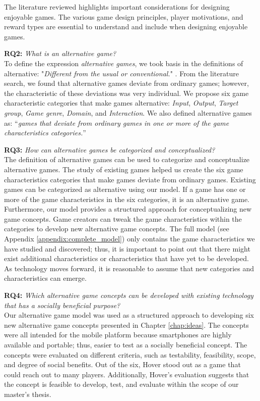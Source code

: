 \documentclass[../Main.tex]{subfiles}
\begin{document}
The literature reviewed highlights important considerations for designing enjoyable games. The various game design principles, player motivations, and reward types are essential to understand and include when designing enjoyable games. 

\textbf{RQ2:} \textit{What is an alternative game?}\\
To define the expression \textit{alternative games}, we took basis in the definitions of alternative: "\textit{Different from the usual or conventional.}" \citep{merriam-webster_alternative_2020}. From the literature search, we found that alternative games deviate from ordinary games; however, the characteristic of these deviations was very individual. We propose six game characteristic categories that make games alternative: \textit{Input}, \textit{Output}, \textit{Target group}, \textit{Game genre}, \textit{Domain}, and \textit{Interaction}. We also defined alternative games as: 
 “\textit{games that deviate from ordinary games in one or more of the game characteristics categories.}”

\textbf{RQ3:} \textit{How can alternative games be categorized and conceptualized?}\\
The definition of alternative games can be used to categorize and conceptualize alternative games. The study of existing games helped us create the six game characteristics categories that make games deviate from ordinary games. Existing games can be categorized as alternative using our model. If a game has one or more of the game characteristics in the six categories, it is an alternative game. Furthermore, our model provides a structured approach for conceptualizing new game concepts. Game creators can tweak the game characteristics within the categories to develop new alternative game concepts. The full model (see Appendix \ref{appendix:complete_model}) only contains the game characteristics we have studied and discovered; thus, it is important to point out that there might exist additional characteristics or characteristics that have yet to be developed. As technology moves forward, it is reasonable to assume that new categories and characteristics can emerge.

\textbf{RQ4:} \textit{Which alternative game concepts can be developed with existing technology that has a socially beneficial purpose?}\\
Our alternative game model was used as a structured approach to developing six new alternative game concepts presented in Chapter \ref{chap:ideas}. The concepts were all intended for the mobile platform because smartphones are highly available and portable; thus, easier to test as a socially beneficial concept. The concepts were evaluated on different criteria, such as testability, feasibility, scope, and degree of social benefits. Out of the six, Hover stood out as a game that could reach out to many players. Additionally, Hover’s evaluation suggests that the concept is feasible to develop, test, and evaluate within the scope of our master's thesis. 
\end{document}
